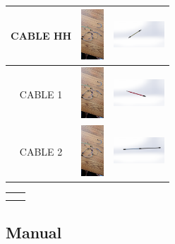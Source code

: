 \begin{table} [H]
\begin{tabular}   {| c |  c |  c | }
        \hline
        CABLE HH & \includegraphics[height=19mm]{7/img/cables.jpg}  & 
       \includegraphics[width=19mm]{7/img/cinco.PNG} \\
        \hline 
         CABLE 1 & \includegraphics[height=19mm]{7/img/cables.jpg}  & 
       \includegraphics[width=19mm]{7/img/seis.PNG} \\
        \hline 
         CABLE 2 & \includegraphics[height=19mm]{7/img/cables.jpg}  & 
       \includegraphics[width=19mm]{7/img/siete.PNG} \\
        \hline 
        
        \end{tabular} 
       
         \label {tab:my_label1}  \label {7/}
          \end{table} 
    
      \begin{tabular}{c|c}
           &  \\
           & 
      \end{tabular}  
    
    \subsection{Manual}
    
